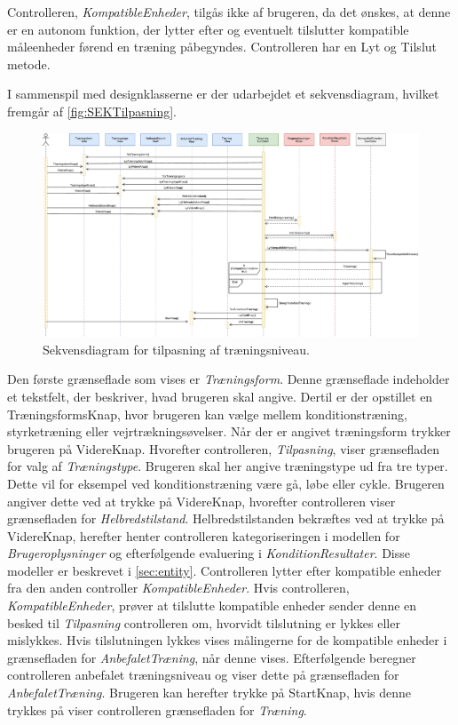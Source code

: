 \noindent 
Controlleren, \textit{KompatibleEnheder}, tilgås ikke af brugeren, da det ønskes, at denne er en autonom funktion, der lytter efter og eventuelt tilslutter kompatible måleenheder førend en træning påbegyndes. Controlleren har en Lyt og Tilslut metode. 

I sammenspil med designklasserne er der udarbejdet et sekvensdiagram, hvilket fremgår af \autoref{fig:SEKTilpasning}. 

\begin{figure} [H]
\centering
\includegraphics[width=1\textwidth]{figures/Sek/SEKTilpasning}
\caption{Sekvensdiagram for tilpasning af træningsniveau.}
\label{fig:SEKTilpasning}
\end{figure}

\noindent
Den første grænseflade som vises er \textit{Træningsform}. Denne grænseflade indeholder et tekstfelt, der beskriver, hvad brugeren skal angive. Dertil er der opstillet en TræningsformsKnap, hvor brugeren kan vælge mellem konditionstræning, styrketræning eller vejrtrækningsøvelser. Når der er angivet træningsform trykker brugeren på VidereKnap. Hvorefter controlleren, \textit{Tilpasning}, viser grænsefladen for valg af \textit{Træningstype}. Brugeren skal her angive træningstype ud fra tre typer. Dette vil for eksempel ved konditionstræning være gå, løbe eller cykle. Brugeren angiver dette ved at trykke på VidereKnap, hvorefter controlleren viser grænsefladen for \textit{Helbredstilstand}. Helbredstilstanden bekræftes ved at trykke på VidereKnap, herefter henter controlleren kategoriseringen i modellen for \textit{Brugeroplysninger} og efterfølgende evaluering i \textit{KonditionResultater}. Disse modeller er beskrevet i \autoref{sec:entity}.
Controlleren lytter efter kompatible enheder fra den anden controller \textit{KompatibleEnheder}. Hvis controlleren, \textit{KompatibleEnheder}, prøver at tilslutte kompatible enheder sender denne en besked til \textit{Tilpasning} controlleren om, hvorvidt tilslutning er lykkes eller mislykkes. Hvis tilslutningen lykkes vises målingerne for de kompatible enheder i grænsefladen for \textit{AnbefaletTræning}, når denne vises. Efterfølgende beregner controlleren anbefalet træningsniveau og viser dette på grænsefladen for \textit{AnbefaletTræning}. Brugeren kan herefter trykke på StartKnap, hvis denne trykkes på viser controlleren grænsefladen for \textit{Træning}. 

